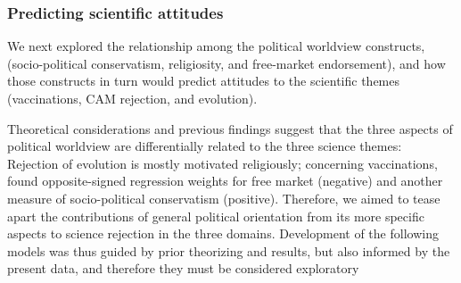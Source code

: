 \documentclass[fignum,man]{apa}\usepackage[]{graphicx}\usepackage[]{color}
\begin{document}
\subsubsection{Predicting scientific attitudes}

We next explored the relationship among the political worldview constructs,
(socio-political conservatism, religiosity, and free-market endorsement), and how those constructs
in turn would predict attitudes to the scientific themes (vaccinations, CAM rejection, and
evolution). 

Theoretical considerations and previous findings suggest that the 
three aspects of political worldview are differentially related to the three science themes: 
Rejection of evolution is mostly motivated religiously; 
concerning vaccinations,  found opposite-signed regression weights for free market (negative) 
and another measure of socio-political conservatism (positive). 
Therefore, we aimed to tease apart the contributions of general political orientation
from its more specific aspects 
to science rejection in the three domains. 
Development of the following models was thus guided by prior theorizing and results, 
but also informed by the present data, and therefore they must be considered exploratory
\end{document}
